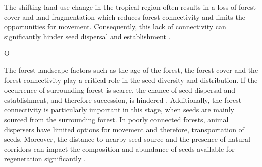 
The shifting land use change in the tropical region often results in a loss of forest cover and land fragmentation which reduces forest connectivity and limits the opportunities for movement. Consequently, this lack of connectivity can significantly hinder seed dispersal and establishment \citep{arroyo-rodriguezMultipleSuccessionalPathways2017}.

O%

The forest landscape factors such as the age of the forest, the forest cover and the forest connectivity play a critical role in the seed diversity and distribution. If the occurrence of surrounding forest is scarce, the chance of seed dispersal and establishment, and therefore succession, is hindered \citep{hordijkLandUseHistory2024}. Additionally, the forest connectivity is particularly important in this stage, when seeds are mainly sourced from the surrounding forest. In poorly connected forests, animal dispersers have limited options for movement and therefore, transportation of seeds.  Moreover, the distance to nearby seed source and the presence of natural corridors can impact the composition and abundance of seeds available for regeneration significantly \citep{dentUnitingNicheDifferentiation2021, arroyo-rodriguezMultipleSuccessionalPathways2017}.


